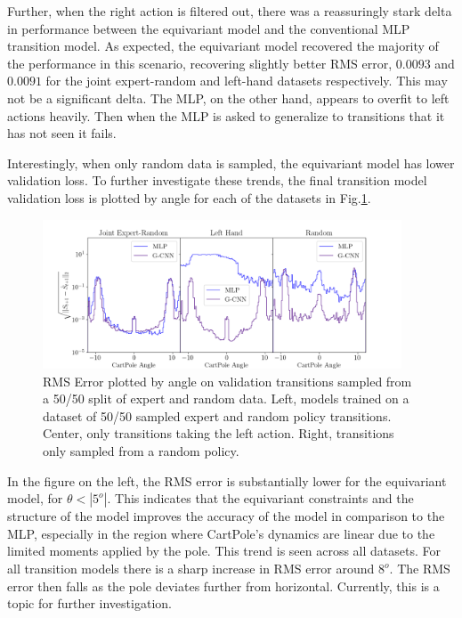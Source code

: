 Further, when the right action is filtered out, there was a reassuringly stark delta in performance between the equivariant model and the conventional MLP transition model. As expected, the equivariant model recovered the majority of the performance in this scenario, recovering slightly better RMS error, $0.0093$ and $0.0091$ for the joint expert-random and left-hand datasets respectively. This may not be a significant delta. The MLP, on the other hand, appears to overfit to left actions heavily. Then when the MLP is asked to generalize to transitions that it has not seen it fails.

Interestingly, when only random data is sampled, the equivariant model has lower validation loss. To further investigate these trends, the final transition model validation loss is plotted by angle for each of the datasets in Fig.\ref{fig:cp_model_angle}.


\begin{figure}[h!]
	\centering
	\includegraphics[width=0.95\textwidth]{./Figures/cart_pole_by_angle.png}
	\caption{RMS Error plotted by angle on validation transitions sampled from a 50/50 split of expert and random data. Left, models trained on a dataset of 50/50 sampled expert and random policy transitions. Center, only transitions taking the left action. Right, transitions only sampled from a random policy.}
	\label{fig:cp_model_angle}
\end{figure}

In the figure on the left, the RMS error is substantially lower for the equivariant model, for $\theta <|5^o|$. This indicates that the equivariant constraints and the structure of the model improves the accuracy of the model in comparison to the MLP, especially in the region where CartPole's dynamics are linear due to the limited moments applied by the pole. This trend is seen across all datasets. For all transition models there is a sharp increase in RMS error around $8^o$. The RMS error then falls as the pole deviates further from horizontal. Currently, this is a topic for further investigation.

